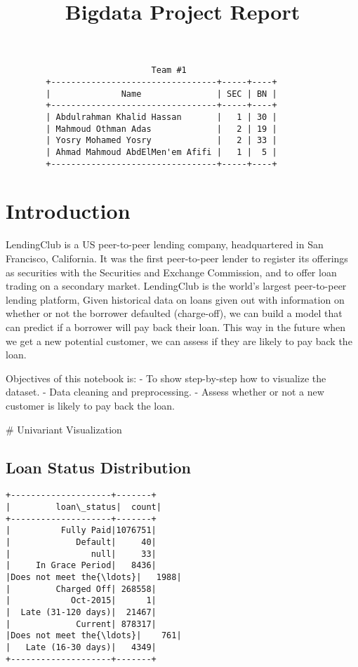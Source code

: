 \documentclass[11pt]{article}
\title{{\Huge Bigdata Project Report}}
\author{}
\begin{document}
    
    \maketitle
    
    
    {\Large 
    \begin{center}
        \begin{verbatim}
                             Team #1
        +---------------------------------+-----+----+
        |              Name               | SEC | BN |
        +---------------------------------+-----+----+
        | Abdulrahman Khalid Hassan       |   1 | 30 |
        | Mahmoud Othman Adas             |   2 | 19 |
        | Yosry Mohamed Yosry             |   2 | 33 |
        | Ahmad Mahmoud AbdElMen'em Afifi |   1 |  5 |
        +---------------------------------+-----+----+
        \end{verbatim}
    \end{center}
    }
    
    \section{Introduction}
    

    LendingClub is a US peer-to-peer lending company, headquartered in San
Francisco, California. It was the first peer-to-peer lender to register
its offerings as securities with the Securities and Exchange Commission,
and to offer loan trading on a secondary market. LendingClub is the
world's largest peer-to-peer lending platform, Given historical data on
loans given out with information on whether or not the borrower
defaulted (charge-off), we can build a model that can predict if a
borrower will pay back their loan. This way in the future when we get a
new potential customer, we can assess if they are likely to pay back the
loan.

Objectives of this notebook is: - To show step-by-step how to visualize
the dataset. - Data cleaning and preprocessing. - Assess whether or not
a new customer is likely to pay back the loan.

    \# Univariant Visualization

    \hypertarget{loan-status-distribution}{%
\subsection{Loan Status Distribution}\label{loan-status-distribution}}

    \begin{Verbatim}[commandchars=\\\{\}]
+--------------------+-------+
|         loan\_status|  count|
+--------------------+-------+
|          Fully Paid|1076751|
|             Default|     40|
|                null|     33|
|     In Grace Period|   8436|
|Does not meet the{\ldots}|   1988|
|         Charged Off| 268558|
|            Oct-2015|      1|
|  Late (31-120 days)|  21467|
|             Current| 878317|
|Does not meet the{\ldots}|    761|
|   Late (16-30 days)|   4349|
+--------------------+-------+

    \end{Verbatim}
\end{document}
